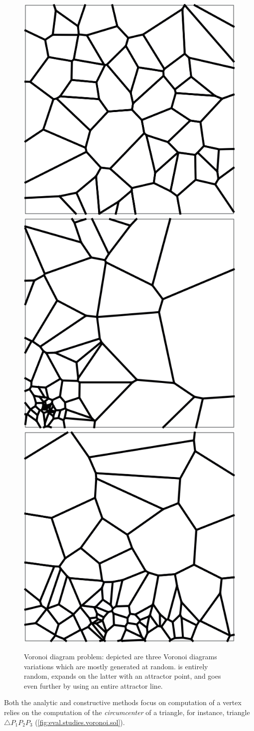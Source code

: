 \begin{figure}[htb]
    {\includegraphics[width=.3\linewidth]{fig/voronoi-problem-rand}}
  \hfill
    {\includegraphics[width=.3\linewidth]{fig/voronoi-problem-1attr}}
  \hfill
    {\includegraphics[width=.3\linewidth]{fig/voronoi-problem-edge}}
  \caption[Voronoi diagram problem]{
    Voronoi diagram problem: depicted are three Voronoi diagrams variations
    which are mostly generated at random.
     is entirely random,
     expands on the latter with an
    attractor point, and  goes even
    further by using an entire attractor line.}%
  \label{fig:eval.studies.voronoi.prob}
\end{figure}

Both the analytic and constructive methods focus on computation of a vertex
relies on the computation of the \textit{circumcenter} of a triangle, for
instance, triangle $\triangle P_1 P_2 P_3$
(\cref{fig:eval.studies.voronoi.sol}).

